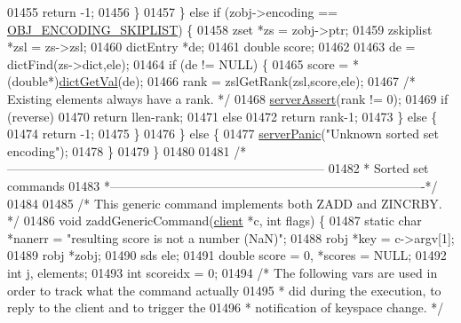 \begin{DoxyCode}
01455             \textcolor{keywordflow}{return} -1;
01456         \}
01457     \} \textcolor{keywordflow}{else} \textcolor{keywordflow}{if} (zobj->encoding == \hyperlink{server_8h_acfb35db5cb30ed113ed23aeb1a224c4c}{OBJ\_ENCODING\_SKIPLIST}) \{
01458         zset *zs = zobj->ptr;
01459         zskiplist *zsl = zs->zsl;
01460         dictEntry *de;
01461         \textcolor{keywordtype}{double} score;
01462 
01463         de = dictFind(zs->dict,ele);
01464         \textcolor{keywordflow}{if} (de != NULL) \{
01465             score = *(\textcolor{keywordtype}{double}*)\hyperlink{dict_8h_ae8d2cc391873b2bea2b87c4f80f43120}{dictGetVal}(de);
01466             rank = zslGetRank(zsl,score,ele);
01467             \textcolor{comment}{/* Existing elements always have a rank. */}
01468             \hyperlink{server_8h_a88114b5169b4c382df6b56506285e56a}{serverAssert}(rank != 0);
01469             \textcolor{keywordflow}{if} (reverse)
01470                 \textcolor{keywordflow}{return} llen-rank;
01471             \textcolor{keywordflow}{else}
01472                 \textcolor{keywordflow}{return} rank-1;
01473         \} \textcolor{keywordflow}{else} \{
01474             \textcolor{keywordflow}{return} -1;
01475         \}
01476     \} \textcolor{keywordflow}{else} \{
01477         \hyperlink{server_8h_a11cc378e7778a830b41240578de3b204}{serverPanic}(\textcolor{stringliteral}{"Unknown sorted set encoding"});
01478     \}
01479 \}
01480 
01481 \textcolor{comment}{/*-----------------------------------------------------------------------------}
01482 \textcolor{comment}{ * Sorted set commands}
01483 \textcolor{comment}{ *----------------------------------------------------------------------------*/}
01484 
01485 \textcolor{comment}{/* This generic command implements both ZADD and ZINCRBY. */}
01486 \textcolor{keywordtype}{void} zaddGenericCommand(\hyperlink{structclient}{client} *c, \textcolor{keywordtype}{int} flags) \{
01487     \textcolor{keyword}{static} \textcolor{keywordtype}{char} *nanerr = \textcolor{stringliteral}{"resulting score is not a number (NaN)"};
01488     robj *key = c->argv[1];
01489     robj *zobj;
01490     sds ele;
01491     \textcolor{keywordtype}{double} score = 0, *scores = NULL;
01492     \textcolor{keywordtype}{int} j, elements;
01493     \textcolor{keywordtype}{int} scoreidx = 0;
01494     \textcolor{comment}{/* The following vars are used in order to track what the command actually}
01495 \textcolor{comment}{     * did during the execution, to reply to the client and to trigger the}
01496 \textcolor{comment}{     * notification of keyspace change. */}

\end{DoxyCode}
